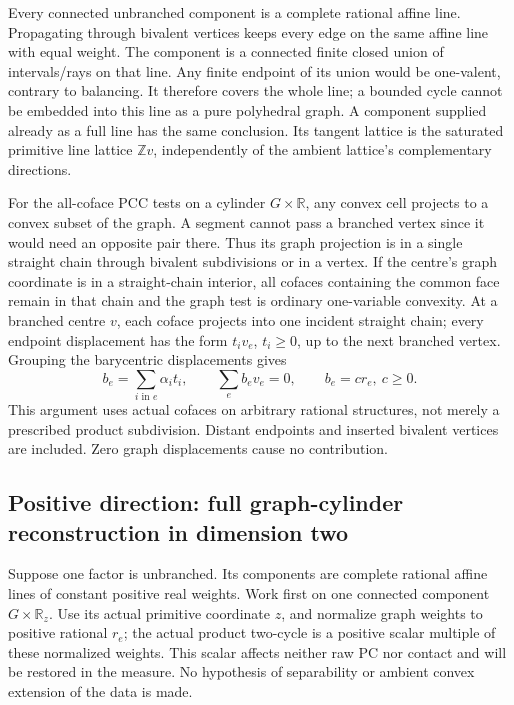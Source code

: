 \documentclass[
  11pt,
]{article}
\begin{document}
Every connected unbranched component is a complete rational affine line.
Propagating through bivalent vertices keeps every edge on the same
affine line with equal weight. The component is a connected finite
closed union of intervals/rays on that line. Any finite endpoint of its
union would be one-valent, contrary to balancing. It therefore covers
the whole line; a bounded cycle cannot be embedded into this line as a
pure polyhedral graph. A component supplied already as a full line has
the same conclusion. Its tangent lattice is the saturated primitive line
lattice \(\mathbb Zv\), independently of the ambient lattice's
complementary directions.

For the all-coface PCC tests on a cylinder \(G\times\mathbb R\), any
convex cell projects to a convex subset of the graph. A segment cannot
pass a branched vertex since it would need an opposite pair there. Thus
its graph projection is in a single straight chain through bivalent
subdivisions or in a vertex. If the centre's graph coordinate is in a
straight-chain interior, all cofaces containing the common face remain
in that chain and the graph test is ordinary one-variable convexity. At
a branched centre \(v\), each coface projects into one incident straight
chain; every endpoint displacement has the form \(t_i v_e\),
\(t_i\geq0\), up to the next branched vertex. Grouping the barycentric
displacements gives \[
 b_e=\sum_{i\text{ in }e}\alpha_i t_i,
 \qquad\sum_e b_ev_e=0,\qquad b_e=c r_e,\ c\geq0.           \tag{9}
\] This argument uses actual cofaces on arbitrary rational structures,
not merely a prescribed product subdivision. Distant endpoints and
inserted bivalent vertices are included. Zero graph displacements cause
no contribution.

\subsection{Positive direction: full graph-cylinder reconstruction in
dimension
two}\label{positive-direction-full-graph-cylinder-reconstruction-in-dimension-two}

Suppose one factor is unbranched. Its components are complete rational
affine lines of constant positive real weights. Work first on one
connected component \(G\times\mathbb R_z\). Use its actual primitive
coordinate \(z\), and normalize graph weights to positive rational
\(r_e\); the actual product two-cycle is a positive scalar multiple of
these normalized weights. This scalar affects neither raw PC nor contact
and will be restored in the measure. No hypothesis of separability or
ambient convex extension of the data is made.
\end{document}
